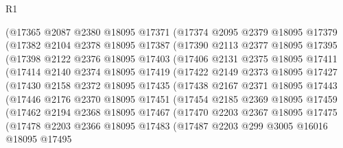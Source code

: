 \begin{lexlean}{R1}
\begin{coremodule}
        (@17365
          @2087
          @2380
          @18095
          @17371
          (@17374
            @2095
            @2379
            @18095
            @17379
            (@17382
              @2104
              @2378
              @18095
              @17387
              (@17390
                @2113
                @2377
                @18095
                @17395
                (@17398
                  @2122
                  @2376
                  @18095
                  @17403
                  (@17406
                    @2131
                    @2375
                    @18095
                    @17411
                    (@17414
                      @2140
                      @2374
                      @18095
                      @17419
                      (@17422
                        @2149
                        @2373
                        @18095
                        @17427
                        (@17430
                          @2158
                          @2372
                          @18095
                          @17435
                          (@17438
                            @2167
                            @2371
                            @18095
                            @17443
                            (@17446
                              @2176
                              @2370
                              @18095
                              @17451
                              (@17454
                                @2185
                                @2369
                                @18095
                                @17459
                                (@17462
                                  @2194
                                  @2368
                                  @18095
                                  @17467
                                  (@17470
                                    @2203
                                    @2367
                                    @18095
                                    @17475
                                    (@17478
                                      @2203
                                      @2366
                                      @18095
                                      @17483
                                      (@17487
                                        @2203
                                        @299
                                        @3005
                                        @16016
                                        @18095
                                        @17495

\end{coremodule}
\end{lexlean}

